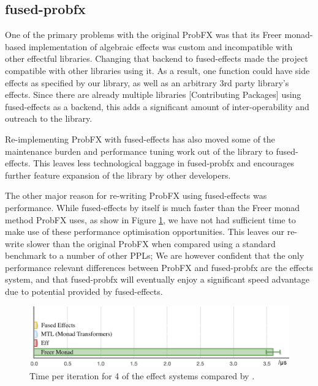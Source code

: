 \documentclass[conference]{IEEEtran}
\begin{document}
\subsection*{fused-probfx}

One of the primary problems with the original ProbFX was that its Freer monad-based implementation of algebraic effects was custom and incompatible with other effectful libraries. Changing that backend to fused-effects made the project compatible with other libraries using it. As a result, one function could have side effects as specified by our library, as well as an arbitrary 3rd party library's effects. Since there are already multiple libraries \cite{FusedEffects} [Contributing Packages] using fused-effects as a backend, this adds a significant amount of inter-operability and outreach to the library.

Re-implementing ProbFX with fused-effects has also moved some of the maintenance burden and performance tuning work out of the library to fused-effects. This leaves less technological baggage in fused-probfx and encourages further feature expansion of the library by other developers.

The other major reason for re-writing ProbFX using fused-effects was performance. While fused-effects by itself is much faster than the Freer monad method ProbFX uses, as show in Figure \ref{fig:effectsbenchmarks}, we have not had sufficient time to make use of these performance optimisation opportunities. This leaves our re-write slower than the original ProbFX when compared using a standard benchmark to a number of other PPLs; We are however confident that the only performance relevant differences between ProbFX and fused-probfx are the effects system, and that fused-probfx will eventually enjoy a significant speed advantage due to potential provided by fused-effects.

\begin{figure}[h]
    \centering
    \includegraphics[width=\linewidth]{images/effect_library_comparison.png}
    \caption{Time per iteration for 4 of the effect systems compared by \cite{effectsbenchmarks}.}
    \label{fig:effectsbenchmarks}
\end{figure}
\end{document}
